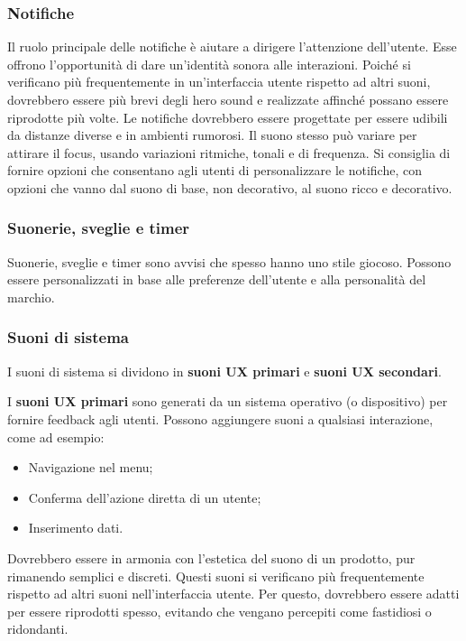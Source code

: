 \documentclass[12pt, a4paper]{report}
\begin{document}
                \subsubsection{Notifiche}
                Il ruolo principale delle notifiche è aiutare a dirigere l'attenzione dell'utente. Esse offrono l'opportunità di dare un'identità sonora alle interazioni. Poiché si verificano più frequentemente in un'interfaccia
                utente rispetto ad altri suoni, dovrebbero essere più brevi degli hero sound e realizzate affinché possano essere riprodotte più volte. Le notifiche dovrebbero essere progettate per essere udibili da distanze diverse e
                in ambienti rumorosi. Il suono stesso può variare per attirare il focus, usando variazioni ritmiche, tonali e di frequenza. Si consiglia di fornire opzioni che consentano agli utenti di personalizzare le notifiche, con
                opzioni che vanno dal suono di base, non decorativo, al suono ricco e decorativo.


                \subsubsection{Suonerie, sveglie e timer}
                Suonerie, sveglie e timer sono avvisi che spesso hanno uno stile giocoso. Possono essere personalizzati in base alle preferenze dell'utente e alla personalità del marchio.


                \subsubsection{Suoni di sistema}
                I suoni di sistema si dividono in \textbf{suoni UX primari} e \textbf{suoni UX secondari}.

                I \textbf{suoni UX primari} sono generati da un sistema operativo (o dispositivo) per fornire feedback agli utenti. Possono aggiungere suoni a qualsiasi interazione, come ad esempio:
                \begin{itemize}
                    \item Navigazione nel menu;
                    \item Conferma dell'azione diretta di un utente;
                    \item Inserimento dati.
                \end{itemize}
                Dovrebbero essere in armonia con l'estetica del suono di un prodotto, pur rimanendo semplici e discreti. Questi suoni si verificano più frequentemente rispetto ad altri suoni nell'interfaccia
                utente. Per questo, dovrebbero essere adatti per essere riprodotti spesso, evitando che vengano percepiti come fastidiosi o ridondanti.
\end{document}
